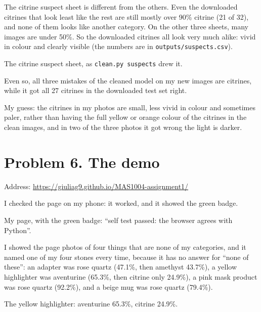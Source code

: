 \documentclass[11pt]{article}
\begin{document}
The citrine suspect sheet is different from the others. Even the downloaded
citrines that look least like the rest are still mostly over 90\% citrine (21 of
32), and none of them looks like another category. On the other three sheets,
many images are under 50\%. So the downloaded citrines all look very much alike:
vivid in colour and clearly visible (the numbers are in
\texttt{outputs/suspects.csv}).


{\small The citrine suspect sheet, as \texttt{clean.py suspects} drew it.}

Even so, all three mistakes of the cleaned model on my
new images are citrines, while it got all 27 citrines in the downloaded test
set right.

My guess: the citrines in my photos are small, less vivid in colour and
sometimes paler, rather than having the full yellow or orange colour of the
citrines in the clean images, and in two of the three photos it got wrong the
light is darker.

\section*{Problem 6. The demo}

Address: \url{https://giuliag9.github.io/MAS1004-assignment1/}

I checked the page on my phone: it worked, and it showed the green badge.

\begin{center}\end{center}
{\small My page, with the green badge: ``self test passed: the browser agrees
with Python''.}

I showed the page photos of four things that are none of my categories, and
it named one of my four stones every time, because it has no answer for ``none
of these'': an adapter was rose quartz (47.1\%, then amethyst 43.7\%), a
yellow highlighter was aventurine (65.3\%, then citrine only 24.9\%), a pink
mask product was rose quartz (92.2\%), and a beige mug was rose quartz
(79.4\%).

\begin{center}\end{center}
{\small The yellow highlighter: aventurine 65.3\%, citrine 24.9\%.}
\end{document}
